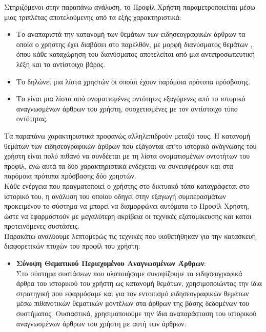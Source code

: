 {{{{{{{{Στηριζόμενοι στην παραπάνω ανάλυση, το Προφίλ Χρήστη παραμετροποιείται μέσω μιας τριπλέτας {} 
αποτελούμενης από τα εξής χαρακτηριστικά: 
\begin{itemize}
\item Το {} αναπαριστά την κατανομή των θεμάτων των ειδησεογραφικών άρθρων τα οποία ο χρήστης έχει διαβάσει στο παρελθόν, 
με μορφή διανύσματος θεμάτων {}, όπου κάθε καταχώρηση του διανύσματος 
αποτελείται από μια αντιπροσωπευτική λέξη και το αντίστοιχο βάρος. 
\item Το {} δηλώνει μια λίστα χρηστών {} οι οποίοι έχουν παρόμοια πρότυπα πρόσβασης.
\item Το {} είναι μια λίστα από ονοματισμένες οντότητες {} εξαγόμενες από 
το ιστορικό αναγνωσμένων άρθρων του χρήστη, συσχετισμένες με τον αντίστοιχο τύπο οντότητας. 
\end{itemize}

Τα παραπάνω χαρακτηριστικά προφανώς αλληλεπιδρούν μεταξύ τους. Η κατανομή θεμάτων των ειδησεογραφικών άρθρων που εξάγονται απ'το ιστορικό 
ανάγνωσης του χρήστη είναι πολύ πιθανό να συνδέεται με τη λίστα ονοματισμένων οντοτήτων του προφίλ, ενώ αυτά τα δύο χαρακτηριστικά 
ενδέχεται να συνεισφέρουν και στα παρόμοια πρότυπα πρόσβασης δύο χρηστών. \\

Κάθε ενέργεια που πραγματοποιεί ο χρήστης στο δικτυακό τόπο καταγράφεται στο ιστορικό του,
η ανάλυση του οποίου οδηγεί στην εξαγωγή συμπερασμάτων προκειμένου το σύστημα να μπορεί
να διαμορφώνει αυτόματα το Προφίλ Χρήστη, ώστε να εφαρμοστούν με μεγαλύτερη ακρίβεια 
οι τεχνικές εξατομίκευσης και κατ οι προτεινόμενες συστάσεις. \\

Παρακάτω αναλύουμε λεπτομερώς τις τεχνικές που υιοθετήθηκαν για την κατασκευή διαφορετικών πτυχών του προφίλ του χρήστη: 
\begin{itemize}
 \item \textbf{Σύνοψη Θεματικού Περιεχομένου Αναγνωσμένων Άρθρων}: \\ 
 Στο σύστημα συστάσεων που υλοποιήσαμε συνοψίζουμε τα ειδησεογραφικά άρθρα του ιστορικού του χρήστη ως κατανομή θεμάτων, 
χρησιμοποιώντας την ίδια στρατηγική που εφαρμόσαμε και για τον εντοπισμό ειδησεογραφικών θεμάτων μέσω πιθανοτικών θεματικών μοντέλων  
στα {} άρθρων της βάσης δεδομένων του συστήματος. 
Ουσιαστικά, χρησιμοποιούμε την ίδια αναπαράσταση του ιστορικού αναγνωσμένων άρθρων του χρήστη 
με αυτή των {} άρθρων.


\end{itemize}}}}}}}}}
